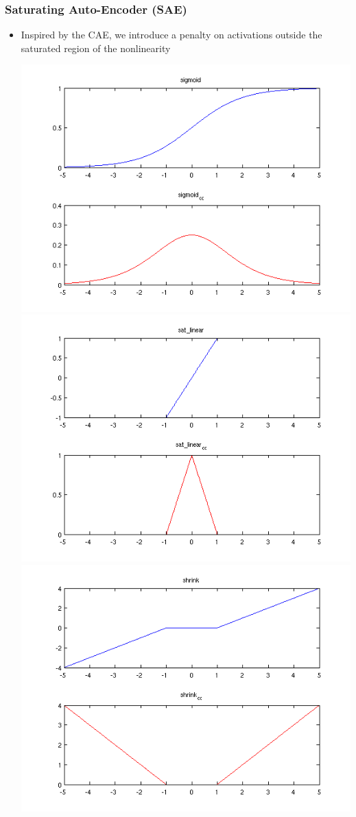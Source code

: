 \documentclass{beamer}
\begin{document}
\begin{frame}
\frametitle{Saturating Auto-Encoder (SAE)} 
\begin{itemize}
\item{Inspired by the CAE, we introduce a penalty on activations outside the saturated region of the nonlinearity} 
\begin{center}
\includegraphics[scale = 0.20]{sigmoid_cc.png}
\includegraphics[scale = 0.20]{sat_linear_cc.png} 
\includegraphics[scale = 0.20]{shrink_cc.png} \\

\end{center}
\end{itemize}
\end{frame}
\end{document}
